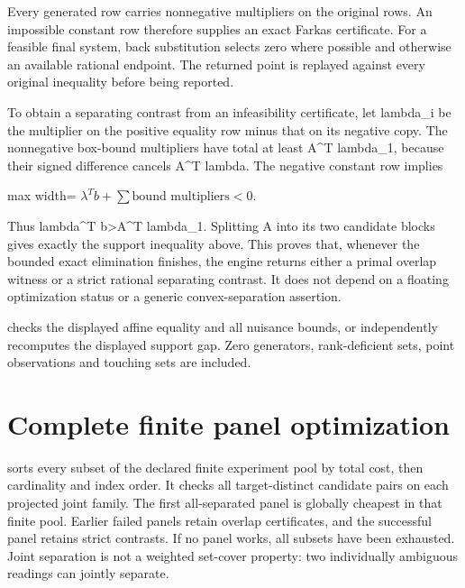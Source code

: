 \documentclass[
  11pt,
  a4paper,
]{report}
\let\singularitytexttt\texttt
\renewcommand{\texttt}[1]{\singularitytexttt{\seqsplit{#1}}}
\begin{document}
Every generated row carries nonnegative multipliers on the original
rows. An impossible constant row therefore supplies an exact Farkas
certificate. For a feasible final system, back substitution selects zero
where possible and otherwise an available rational endpoint. The
returned point is replayed against every original inequality before
being reported.

To obtain a separating contrast from an infeasibility certificate, let
lambda\_i be the multiplier on the positive equality row minus that on
its negative copy. The nonnegative box-bound multipliers have total at
least \textbar\textbar A\textasciicircum{}T lambda\textbar\textbar\_1, because their
signed difference cancels A\textasciicircum{}T lambda. The negative constant row
implies

\begin{center}
\begin{adjustbox}{max width=\linewidth}
$\displaystyle
\lambda^Tb+\textstyle\sum\text{bound multipliers}<0.
$
\end{adjustbox}
\end{center}

Thus \textbar lambda\textasciicircum{}T b\textbar\textgreater\textbar\textbar A\textasciicircum{}T
lambda\textbar\textbar\_1. Splitting A into its two candidate blocks
gives exactly the support inequality above. This proves that, whenever
the bounded exact elimination finishes, the engine returns either a
primal overlap witness or a strict rational separating contrast. It does
not depend on a floating optimization status or a generic
convex-separation assertion.

\texttt{verify\_joint\_certificate} checks the displayed affine equality
and all nuisance bounds, or independently recomputes the displayed
support gap. Zero generators, rank-deficient sets, point observations
and touching sets are included.

\hypertarget{complete-finite-panel-optimization}{%
\section{Complete finite panel
optimization}\label{complete-finite-panel-optimization}}

\texttt{minimum\_joint\_panel} sorts every subset of the declared finite
experiment pool by total cost, then cardinality and index order. It
checks all target-distinct candidate pairs on each projected joint
family. The first all-separated panel is globally cheapest in that
finite pool. Earlier failed panels retain overlap certificates, and the
successful panel retains strict contrasts. If no panel works, all
subsets have been exhausted. Joint separation is not a weighted
set-cover property: two individually ambiguous readings can jointly
separate.
\end{document}
